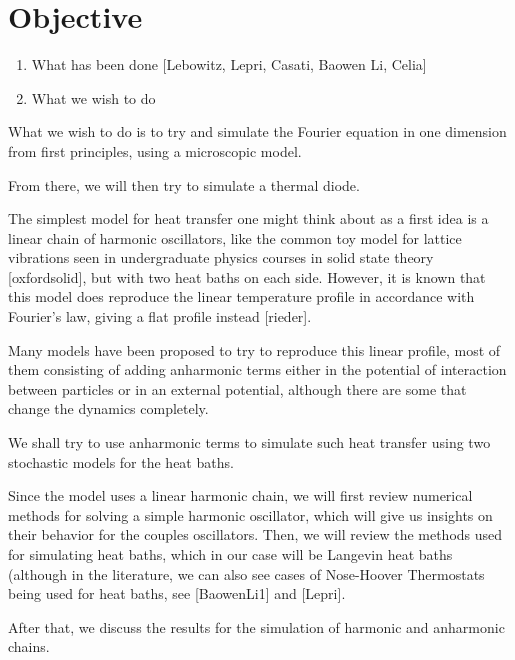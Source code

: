 \section{Objective}

\begin{enumerate}
	\item What has been done [Lebowitz, Lepri, Casati, Baowen Li, Celia]
	
	\item What we wish to do
\end{enumerate}

What we wish to do is to try and simulate the Fourier equation in one dimension from first principles, using a microscopic model.

From there, we will then try to simulate a thermal diode.

The simplest model for heat transfer one might think about as a first idea is a linear chain of harmonic oscillators, like the common toy model for lattice vibrations seen in undergraduate physics courses in solid state theory [oxfordsolid], but with two heat baths on each side. However, it is known that this model does reproduce the linear temperature profile in accordance with Fourier's law, giving a flat profile instead [rieder].

Many models have been proposed to try to reproduce this linear profile, most of them consisting of adding anharmonic terms either in the potential of interaction between particles or in an external potential, although there are some that change the dynamics completely.

We shall try to use anharmonic terms to simulate such heat transfer using two stochastic models for the heat baths.

Since the model uses a linear harmonic chain, we will first review numerical methods for solving a simple harmonic oscillator, which will give us insights on their behavior for the couples oscillators. Then, we will review the methods used for simulating heat baths, which in our case will be Langevin heat baths (although in the literature, we can also see cases of Nose-Hoover Thermostats being used for heat baths, see [BaowenLi1] and [Lepri].

After that, we discuss the results for the simulation of harmonic and anharmonic chains.


